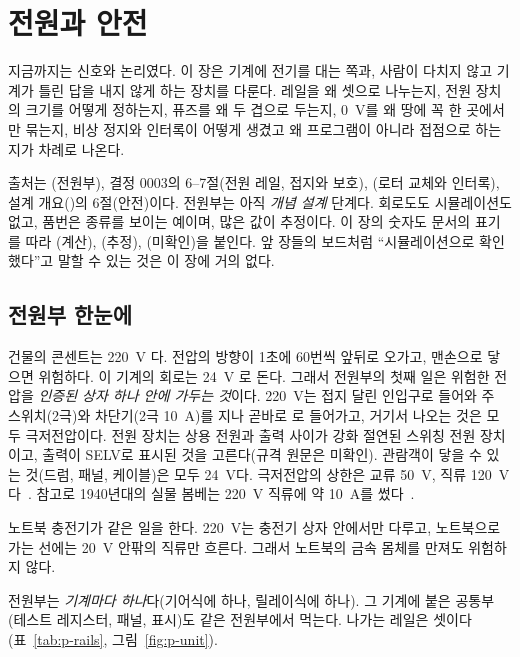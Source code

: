 \chapter{전원과 안전}\label{ch:44-power-safety}

지금까지는 신호와 논리였다. 이 장은 기계에 전기를 대는 쪽과, 사람이 다치지 않고 기계가 틀린 답을 내지 않게 하는
장치를 다룬다. 레일을 왜 셋으로 나누는지, 전원 장치의 크기를 어떻게 정하는지, 퓨즈를 왜 두 겹으로 두는지, 0~V를
왜 땅에 꼭 한 곳에서만 묶는지, 비상 정지와 인터록이 어떻게 생겼고 왜 프로그램이 아니라 접점으로 하는지가 차례로
나온다.

출처는 (전원부), 결정 0003의 6--7절(전원 레일, 접지와 보호),
(로터 교체와 인터록), 설계 개요()의 6절(안전)이다. 전원부는
아직 \emph{개념 설계} 단계다. 회로도도 시뮬레이션도 없고, 품번은 종류를 보이는 예이며, 많은 값이 추정이다. 이 장의
숫자도 문서의 표기를 따라 (계산), (추정), (미확인)을 붙인다. 앞 장들의 보드처럼 ``시뮬레이션으로 확인했다''고 말할
수 있는 것은 이 장에 거의 없다.

\section{전원부 한눈에}\label{sec:p-overview}

\Why 건물의 콘센트는 220~V 다. 전압의 방향이 1초에 60번씩 앞뒤로 오가고, 맨손으로 닿으면 위험하다. 이 기계의
회로는 24~V 로 돈다. 그래서 전원부의 첫째 일은 위험한 전압을 \emph{인증된 상자 하나 안에 가두는 것}이다.
220~V는 접지 달린 인입구로 들어와 주 스위치(2극)와 차단기(2극 10~A)를 지나 곧바로 로 들어가고, 거기서 나오는 것은 모두 극저전압이다. 전원 장치는 상용 전원과 출력 사이가 강화 절연된 스위칭 전원
장치이고, 출력이 SELV로 표시된 것을 고른다(규격 원문은 미확인). 관람객이 닿을 수 있는 것(드럼, 패널, 케이블)은 모두
24~V다. 극저전압의 상한은 교류 50~V, 직류 120~V다~\cite{iec61140}. 참고로 1940년대의 실물 봄베는 220~V 직류에 약
10~A를 썼다~\cite{us6812report1944}.

\General 노트북 충전기가 같은 일을 한다. 220~V는 충전기 상자 안에서만 다루고, 노트북으로 가는 선에는 20~V 안팎의 직류만
흐른다. 그래서 노트북의 금속 몸체를 만져도 위험하지 않다.

\Ours 전원부는 \emph{기계마다 하나}다(기어식에 하나, 릴레이식에 하나). 그 기계에 붙은 공통부(테스트 레지스터, 패널,
표시)도 같은 전원부에서 먹는다. 나가는 레일은 셋이다(표~\ref{tab:p-rails}, 그림~\ref{fig:p-unit}).

